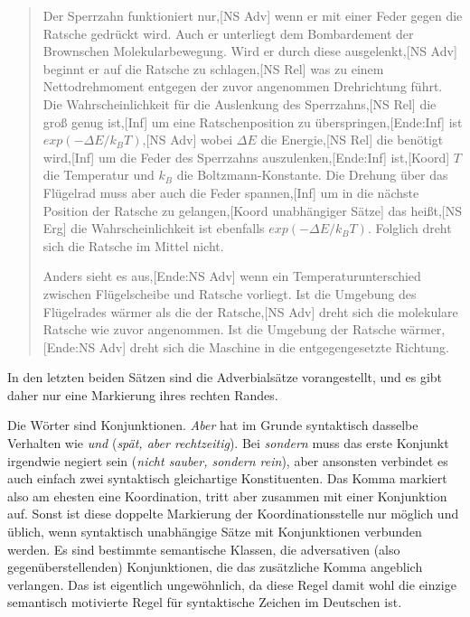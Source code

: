 \begin{sloppypar}
\begin{quote}
Der Sperrzahn funktioniert nur,[NS Adv] wenn er mit einer Feder gegen die Ratsche gedrückt wird.
Auch er unterliegt dem Bombardement der Brownschen Molekularbewegung.
Wird er durch diese ausgelenkt,[NS Adv] beginnt er auf die Ratsche zu schlagen,[NS Rel] was zu einem Nettodrehmoment entgegen der zuvor angenommen Drehrichtung führt.
Die Wahrscheinlichkeit für die Auslenkung des Sperrzahns,[NS Rel] die groß genug ist,[Inf] um eine Ratschenposition zu überspringen,[Ende:Inf] ist $exp(-\Delta E/k_BT)$,[NS Adv] wobei $\Delta E$ die Energie,[NS Rel] die benötigt wird,[Inf] um die Feder des Sperrzahns auszulenken,[Ende:Inf] ist,[Koord] $T$ die Temperatur und $k_B$ die Boltzmann-Konstante.
Die Drehung über das Flügelrad muss aber auch die Feder spannen,[Inf] um in die nächste Position der Ratsche zu gelangen,[Koord unabhängiger Sätze] das heißt,[NS Erg] die Wahrscheinlichkeit ist ebenfalls $exp(-\Delta E/k_BT)$.
Folglich dreht sich die Ratsche im Mittel nicht.

Anders sieht es aus,[Ende:NS Adv] wenn ein Temperaturunterschied zwischen Flügelscheibe und Ratsche vorliegt.
Ist die Umgebung des Flügelrades wärmer als die der Ratsche,[NS Adv] dreht sich die molekulare Ratsche wie zuvor angenommen.
Ist die Umgebung der Ratsche wärmer,[Ende:NS Adv] dreht sich die Maschine in die entgegengesetzte Richtung.
\end{quote}
\end{sloppypar}

In den letzten beiden Sätzen sind die Adverbialsätze vorangestellt, und es gibt daher nur eine Markierung ihres rechten Randes.

\label{sol:morphosyntaktischeschreibprinzipien03} Die Wörter sind Konjunktionen.
\textit{Aber} hat im Grunde syntaktisch dasselbe Verhalten wie \textit{und} (\textit{spät, aber rechtzeitig}).
Bei \textit{sondern} muss das erste Konjunkt irgendwie negiert sein (\textit{nicht sauber, sondern rein}), aber ansonsten verbindet es auch einfach zwei syntaktisch gleichartige Konstituenten.
Das Komma markiert also am ehesten eine Koordination, tritt aber zusammen mit einer Konjunktion auf.
Sonst ist diese doppelte Markierung der Koordinationsstelle nur möglich und üblich, wenn syntaktisch unabhängige Sätze mit Konjunktionen verbunden werden.
Es sind bestimmte semantische Klassen, \zB die adversativen (also gegenüberstellenden) Konjunktionen, die das zusätzliche Komma angeblich verlangen.
Das ist eigentlich ungewöhnlich, da diese Regel damit wohl die einzige semantisch motivierte Regel für syntaktische Zeichen im Deutschen ist.

